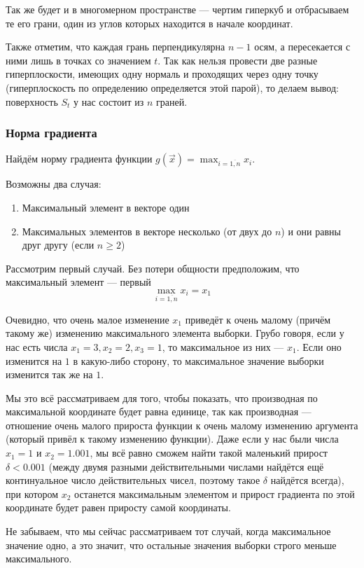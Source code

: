 Так же будет и в многомерном пространстве --- чертим гиперкуб
и отбрасываем те его грани, один из углов которых находится в начале координат.

Также отметим, что каждая грань перпендикулярна $n-1$ осям,
а пересекается с ними лишь в точках со значением $t$.
Так как нельзя провести две разные гиперплоскости, имеющих одну нормаль
и проходящих через одну точку (гиперплоскость по определению
определяется этой парой), то делаем вывод:
поверхность $S_t$ у нас состоит из $n$ граней.

\subsubsection{Норма градиента}
Найдём норму градиента функции
$g\left( \vec{x} \right) = \max_{i= \overline{1,n}} x_i$.

Возможны два случая:
\begin{enumerate}
  \item Максимальный элемент в векторе один
  \item Максимальных элементов в векторе несколько
      (от двух до $n$) и они равны друг другу (если $n \ge 2$)
\end{enumerate}

Рассмотрим первый случай. Без потери общности предположим,
что максимальный элемент --- первый
$$\max_{i= \overline{1,n}} x_i = x_1$$

Очевидно, что очень малое изменение $x_1$ приведёт к
очень малому (причём такому же) изменению максимального элемента выборки.
Грубо говоря, если у нас есть числа $x_1 = 3, x_2 = 2, x_3 = 1$,
то максимальное из них --- $x_1$. Если оно изменится на $1$
в какую-либо сторону, то максимальное значение выборки изменится
так же на $1$.

Мы это всё рассматриваем для того, чтобы показать,
что производная по максимальной координате будет равна единице,
так как производная --- отношение очень малого прироста функции
к очень малому изменению аргумента (который привёл к такому изменению функции).
Даже если у нас были числа $x_1 = 1$ и $x_2 = 1.001$,
мы всё равно сможем найти такой маленький прирост $\delta < 0.001$
(между двумя разными действительными числами найдётся ещё континуальное число
действительных чисел, поэтому такое $\delta$ найдётся всегда),
при котором $x_2$ останется максимальным элементом и прирост градиента
по этой координате будет равен приросту самой координаты.

Не забываем, что мы сейчас рассматриваем тот случай,
когда максимальное значение одно, а это значит,
что остальные значения выборки строго меньше максимального.

